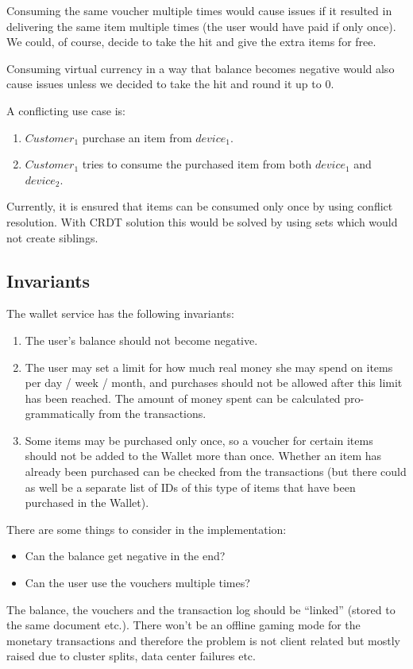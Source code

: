 \documentclass[11pt,a4paper]{report}
\begin{document}
Consuming the same voucher multiple times would cause issues if it resulted in delivering the same item multiple times (the user would have paid if only once). We could, of course, decide to take the hit and give the extra items for free.

Consuming virtual currency in a way that balance becomes negative would also cause issues unless we decided to take the hit and round it up to 0.

A conflicting use case is:
\begin{enumerate}
	\item $Customer_1$ purchase an item from $device_1$.
	\item $Customer_1$ tries to consume the purchased item from both $device_1$ and $device_2$.
\end{enumerate}
Currently, it is ensured that items can be consumed only once by using conflict resolution. With CRDT solution this would be solved by using sets which would not create siblings.


\subsection{Invariants}
The wallet  service has the following invariants:
\begin{enumerate}
\item The user's balance should not become negative.
\item The user may set a limit for how much real money she may spend on items per day / week / month, and purchases should not be allowed after this limit has been reached. The amount of money spent can be calculated pro-grammatically from the transactions.
\item Some items may be purchased only once, so a voucher for certain items should not be added to the Wallet more than once. Whether an item has already been purchased can be checked from the transactions (but there could as well be a separate list of IDs of this type of items that have been purchased in the Wallet).
\end{enumerate}
There are some things to consider in the implementation:

\begin{itemize}
\item Can the balance get negative in the end?
\item Can the user use the vouchers multiple times?
\end{itemize}

The balance, the vouchers and the transaction log should be ``linked'' (stored to the same document etc.). There won't be an offline gaming mode for the monetary transactions and therefore the problem is not client related but mostly raised due to cluster splits, data center failures etc.
\end{document}
